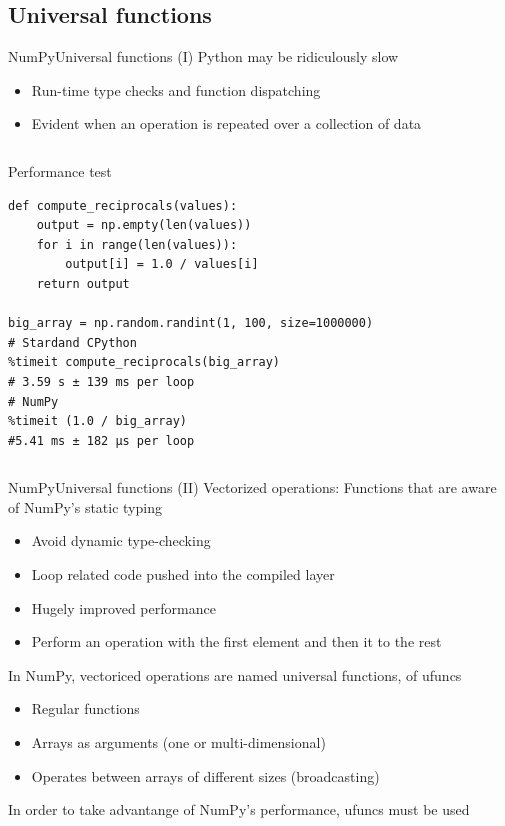 \documentclass[10pt,compress]{beamer} %
\begin{document}
\subsection{Universal functions}
\begin{frame}[fragile]{NumPy}{Universal functions (I)}
	Python may be ridiculously slow
	\begin{itemize}
		\item Run-time type checks and function dispatching
		\item Evident when an operation is repeated over a collection of data
	\end{itemize}

	\vspace{-0.2cm} 
	\begin{columns}
		\begin{exampleblock}{\footnotesize{Performance test}}
		\vspace{-0.2cm} 
			\begin{lstlisting}
def compute_reciprocals(values):
    output = np.empty(len(values))
    for i in range(len(values)):
        output[i] = 1.0 / values[i]
    return output

big_array = np.random.randint(1, 100, size=1000000)
# Stardand CPython
%timeit compute_reciprocals(big_array)
# 3.59 s ± 139 ms per loop 
# NumPy
%timeit (1.0 / big_array)
#5.41 ms ± 182 µs per loop
			\end{lstlisting}
		\vspace{-0.2cm} 
		\end{exampleblock}
	\end{columns}
\end{frame}

\begin{frame}{NumPy}{Universal functions (II)}
	Vectorized operations: Functions that are aware of NumPy's static typing
	\begin{itemize}
		\item Avoid dynamic type-checking
		\item Loop related code pushed into the compiled layer
		\item Hugely improved performance
		\item Perform an operation with the first element and then it to the rest
	\end{itemize}
	In NumPy, vectoriced operations are named \alert{universal functions}, of \alert{ufuncs}
	\begin{itemize}
		\item Regular functions
		\item Arrays as arguments (one or multi-dimensional)
		\item Operates between arrays of different sizes (\alert{broadcasting})
	\end{itemize}
	In order to take advantange of NumPy's performance, ufuncs must be used
\end{frame}
\end{document}

